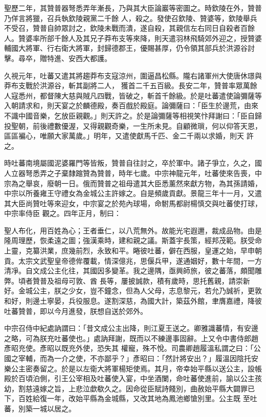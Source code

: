 \begin{pinyinscope}
 聖歷二年，其贊普器弩悉弄年漸長，乃與其大臣論巖等密圖之。時欽陵在外，贊普乃佯言將獵，召兵執欽陵親黨二千餘
 人，殺之。發使召欽陵、贊婆等，欽陵舉兵不受召，贊普自帥眾討之，欽陵未戰而潰，遂自殺，其親信左右同日自殺者百餘人。贊婆率所部千餘人及其兄子莽布支等來降，則天遣羽林飛騎郊外迎之，授贊婆輔國大將軍、行右衛大將軍，封歸德郡王，優賜甚厚，仍令領其部兵於洪源谷討擊。尋卒，贈特進、安西大都護。



 久視元年，吐蕃又遣其將趨莽布支寇涼州，圍逼昌松縣。隴右諸軍州大使唐休璟與莽布支戰於洪源谷，斬其副將二人，
 獲首二千五百級。長安二年，贊普率眾萬餘人寇悉州，都督陳大慈與賊凡四戰，皆破之，斬首千餘級。於是吐蕃遣使論彌薩等入朝請求和，則天宴之於麟德殿，奏百戲於殿庭。論彌薩曰：「臣生於邊荒，由來不識中國音樂，乞放臣親觀。」則天許之。於是論彌薩等相視笑忭拜謝曰：「臣自歸投聖朝，前後禮數優渥，又得親觀奇樂，一生所未見。自顧微瑣，何以仰答天恩，區區褊心，唯願大家萬歲。」明年，又遣使獻馬千匹、金二千兩以求婚，則天
 許之。



 時吐蕃南境屬國泥婆羅門等皆叛，贊普自往討之，卒於軍中。諸子爭立，久之，國人立器弩悉弄之子棄隸蹜贊為贊普，時年七歲。中宗神龍元年，吐蕃使來告喪，中宗為之舉哀，廢朝一日。俄而贊普之祖母遣其大臣悉薰然來獻方物，為其孫請婚，中宗以所養雍王守禮女為金城公主許嫁之。自是頻歲貢獻。景龍三年十一月，又遣其大臣尚贊吐等來迎女，中宗宴之於苑內球場，命駙馬都尉楊慎交與吐蕃使打球，中宗率侍臣
 觀之。四年正月，制曰：



 聖人布化，用百姓為心；王者垂仁，以八荒無外。故能光宅遐邇，裁成品物。由是隆周理歷，恢柔遠之圖；強漢乘時，建和親之議。斯蓋宇長策，經邦茂範。朕受命上靈，克纂洪業，庶幾前烈，永致和平。睠彼吐蕃，僻在西服，皇運之始，早申朝貢。太宗文武聖皇帝德侔覆載，情深億兆，思偃兵甲，遂通姻好，數十年間，一方清凈。自文成公主化往，其國因多變革。我之邊隅，亟興師旅，彼之蕃落，頗聞雕弊。頃者贊普及祖母可敦、酋
 長等，屢披誠款，積有歲時，思托舊親，請崇新好。金城公主，朕之少女，豈不鐘念，但為人父母，志息黎元，若允乃誠祈，更敦和好，則邊土寧晏，兵役服息。遂割深慈，為國大計，築茲外館，聿膺嘉禮，降彼吐蕃贊普，即以今月進發，朕想自送於郊外。



 中宗召侍中紀處訥謂曰：「昔文成公主出降，則江夏王送之。卿雅識蕃情，有安邊之略，可為朕充吐蕃使也。」處訥拜謝，既而以不練邊事固辭。上又令中書侍郎趙彥昭充使。彥昭以既充外使，恐失其
 權寵，殊不悅。司農卿趙履溫私謂之曰：「公國之宰輔，而為一介之使，不亦鄙乎？」彥昭曰：「然計將安出？」履溫因陰托安樂公主密奏留之。於是以左衛大將軍楊矩使焉。其月，帝幸始平縣以送公主，設帳殿於百頃泊側，引王公宰相及吐蕃使入宴，中坐酒闌，命吐蕃使進前，諭以公主孩幼，割慈遠嫁之旨，上悲泣歔欷久之。因命從臣賦詩餞別，曲赦始平縣大闢罪已下，百姓給復一年，改始平縣為金城縣，又改其地為鳳池鄉愴別里。公主既
 至吐蕃，別築一城以居之。




\end{pinyinscope}
